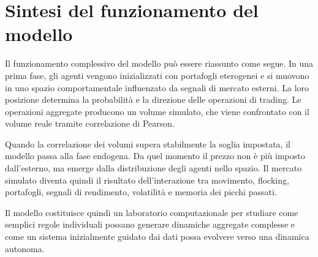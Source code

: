 \section{Sintesi del funzionamento del modello}

Il funzionamento complessivo del modello può essere riassunto come segue. In una
prima fase, gli agenti vengono inizializzati con portafogli eterogenei e si
muovono in uno spazio comportamentale influenzato da segnali di mercato esterni.
La loro posizione determina la probabilità e la direzione delle operazioni di
trading. Le operazioni aggregate producono un volume simulato, che viene
confrontato con il volume reale tramite correlazione di Pearson.

Quando la correlazione dei volumi supera stabilmente la soglia impostata, il
modello passa alla fase endogena. Da quel momento il prezzo non è più imposto
dall'esterno, ma emerge dalla distribuzione degli agenti nello spazio. Il mercato
simulato diventa quindi il risultato dell'interazione tra movimento, flocking,
portafogli, segnali di rendimento, volatilità e memoria dei picchi passati.

Il modello costituisce quindi un laboratorio computazionale per studiare come
semplici regole individuali possano generare dinamiche aggregate complesse e
come un sistema inizialmente guidato dai dati possa evolvere verso una dinamica
autonoma.